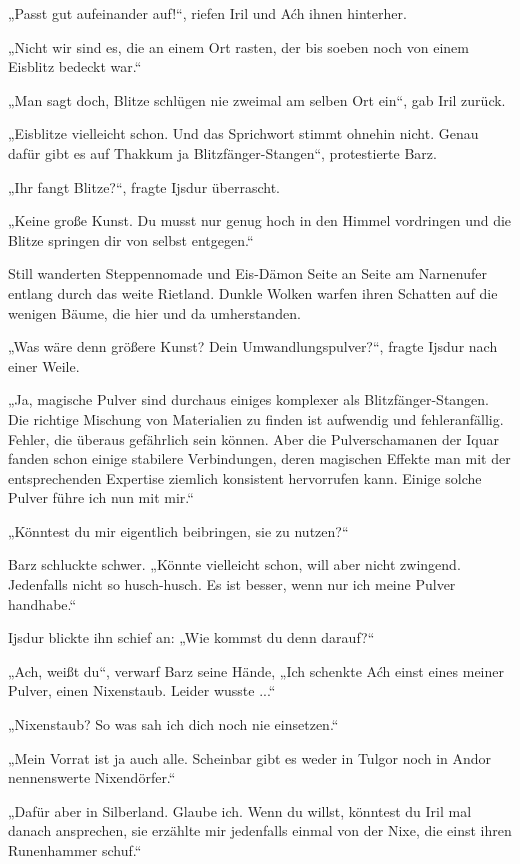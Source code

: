 „Passt gut aufeinander auf!“, riefen Iril und Aćh ihnen hinterher.

„Nicht wir sind es, die an einem Ort rasten, der bis soeben noch von einem Eisblitz bedeckt war.“

„Man sagt doch, Blitze schlügen nie zweimal am selben Ort ein“, gab Iril zurück.

„Eisblitze vielleicht schon. Und das Sprichwort stimmt ohnehin nicht. Genau dafür gibt es auf Thakkum ja Blitzfänger-Stangen“, protestierte Barz.

„Ihr fangt Blitze?“, fragte Ijsdur überrascht.

„Keine große Kunst. Du musst nur genug hoch in den Himmel vordringen und die Blitze springen dir von selbst entgegen.“

Still wanderten Steppennomade und Eis-Dämon Seite an Seite am Narnenufer entlang durch das weite Rietland. Dunkle Wolken warfen ihren Schatten auf die wenigen Bäume, die hier und da umherstanden.

„Was wäre denn größere Kunst? Dein Umwandlungspulver?“, fragte Ijsdur nach einer Weile.

„Ja, magische Pulver sind durchaus einiges komplexer als Blitzfänger-Stangen. Die richtige Mischung von Materialien zu finden ist aufwendig und fehleranfällig. Fehler, die überaus gefährlich sein können. Aber die Pulverschamanen der Iquar fanden schon einige stabilere Verbindungen, deren magischen Effekte man mit der entsprechenden Expertise ziemlich konsistent hervorrufen kann. Einige solche Pulver führe ich nun mit mir.“

„Könntest du mir eigentlich beibringen, sie zu nutzen?“

Barz schluckte schwer. „Könnte vielleicht schon, will aber nicht zwingend. Jedenfalls nicht so husch-husch. Es ist besser, wenn nur ich meine Pulver handhabe.“

Ijsdur blickte ihn schief an: „Wie kommst du denn darauf?“

„Ach, weißt du“, verwarf Barz seine Hände, „Ich schenkte Aćh einst eines meiner Pulver, einen Nixenstaub. Leider wusste ...“

„Nixenstaub? So was sah ich dich noch nie einsetzen.“

„Mein Vorrat ist ja auch alle. Scheinbar gibt es weder in Tulgor noch in Andor nennenswerte Nixendörfer.“

„Dafür aber in Silberland. Glaube ich. Wenn du willst, könntest du Iril mal danach ansprechen, sie erzählte mir jedenfalls einmal von der Nixe, die einst ihren Runenhammer schuf.“

